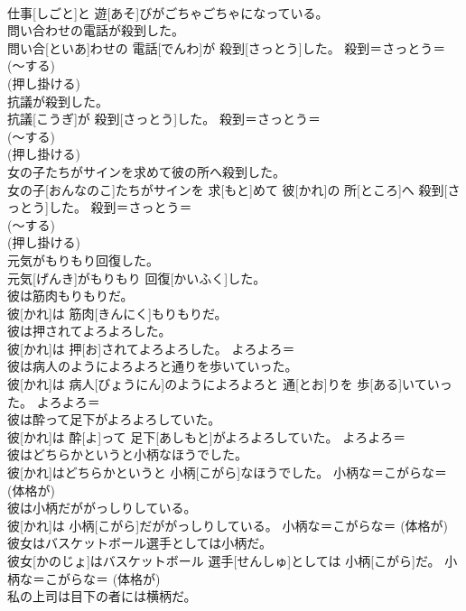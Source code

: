 \documentclass[8pt]{extreport}
\begin{document}
\begin{CJK}{UTF8}{min}
{\\	仕事[しごと]と 遊[あそ]びがごちゃごちゃになっている。	
\\	問い合わせの電話が殺到した。	
\\	問い合[といあ]わせの 電話[でんわ]が 殺到[さっとう]した。	殺到＝さっとう＝ 
\\	(〜する) 
\\	(押し掛ける) 
\\	抗議が殺到した。	
\\	抗議[こうぎ]が 殺到[さっとう]した。	殺到＝さっとう＝ 
\\	(〜する) 
\\	(押し掛ける) 
\\	女の子たちがサインを求めて彼の所へ殺到した。	
\\	女の子[おんなのこ]たちがサインを 求[もと]めて 彼[かれ]の 所[ところ]へ 殺到[さっとう]した。	殺到＝さっとう＝ 
\\	(〜する) 
\\	(押し掛ける) 
\\	元気がもりもり回復した。	
\\	元気[げんき]がもりもり 回復[かいふく]した。	
\\	彼は筋肉もりもりだ。	
\\	彼[かれ]は 筋肉[きんにく]もりもりだ。	
\\	彼は押されてよろよろした。	
\\	彼[かれ]は 押[お]されてよろよろした。	よろよろ＝ 
\\	彼は病人のようによろよろと通りを歩いていった。	
\\	彼[かれ]は 病人[びょうにん]のようによろよろと 通[とお]りを 歩[ある]いていった。	よろよろ＝ 
\\	彼は酔って足下がよろよろしていた。	
\\	彼[かれ]は 酔[よ]って 足下[あしもと]がよろよろしていた。	よろよろ＝ 
\\	彼はどちらかというと小柄なほうでした。	
\\	彼[かれ]はどちらかというと 小柄[こがら]なほうでした。	小柄な＝こがらな＝ (体格が) 
\\	彼は小柄だががっしりしている。	
\\	彼[かれ]は 小柄[こがら]だががっしりしている。	小柄な＝こがらな＝ (体格が) 
\\	彼女はバスケットボール選手としては小柄だ。	
\\	彼女[かのじょ]はバスケットボール 選手[せんしゅ]としては 小柄[こがら]だ。	小柄な＝こがらな＝ (体格が) 
\\	私の上司は目下の者には横柄だ。	
}
\end{CJK}
\end{document}
